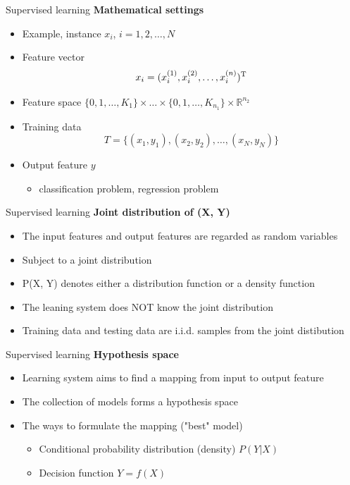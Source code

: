 \documentclass{beamer}
\begin{document}
\begin{frame}{Supervised learning}
\textbf{Mathematical settings}
\begin{itemize}
\item Example, instance $x_i$, $i= 1, 2, \ldots, N$
\item Feature vector 
$$
x_i = (x^{(1)}_i, x^{(2)}_i, \ldots, x^{(n)}_i)^{\rm T}
$$
\item Feature space $\{0, 1, \ldots, K_1\}\times\ldots\times \{0, 1, \ldots, K_{n_1}\}\times\mathbb{R}^{n_2}$
\item Training data
$$
T= \{(x_1, y_1), (x_2, y_2),\ldots,  (x_N, y_N)\}
$$
\item Output feature $y$
\begin{itemize}
\item classification problem, regression problem
\end{itemize}
\end{itemize}
\end{frame}

\begin{frame}{Supervised learning}
\textbf{Joint distribution of (X, Y)}
\begin{itemize}
\item The input features and output features are regarded as random variables
\item Subject to a joint distribution
\item P(X, Y) denotes either a distribution function or a density function
\item The leaning system does NOT know the joint distribution
\item Training data and testing data are i.i.d. samples from the joint distibution
\end{itemize}
\end{frame}

\begin{frame}{Supervised learning}
\textbf{Hypothesis space}
\begin{itemize}
\item Learning system aims to find a mapping from input to output feature
\item The collection of models forms a hypothesis space
\item The ways to formulate the mapping ("best" model)
\begin{itemize}
\item Conditional probability distribution (density) $P(Y|X)$
\item Decision function $Y=f(X)$
\end{itemize}
\end{itemize}
\end{frame}
\end{document}
